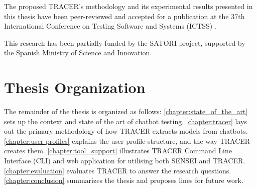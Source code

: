 The proposed \ac{TRACER}'s methodology and its experimental results presented in this thesis
have been peer-reviewed and accepted for a publication at the
37th International Conference on Testing Software and Systems (ICTSS)
\autocite{sotillodelhornoAutomatedExplorationConversational2025}.

This research has been partially funded by the SATORI project, supported by the Spanish Ministry of Science and Innovation.

\section{Thesis Organization}

The remainder of the thesis is organized as follows:
\autoref{chapter:state_of_the_art} sets up the context and state of the art of chatbot testing.
\autoref{chapter:tracer} lays out the primary methodology of how \ac{TRACER} extracts models from chatbots.
\autoref{chapter:user-profiles} explains the user profile structure, and the way \ac{TRACER} creates them.
\autoref{chapter:tool_support} illustrates \ac{TRACER} Command Line Interface (CLI) and web application for utilising both SENSEI and \ac{TRACER}.
\autoref{chapter:evaluation}
evaluates \ac{TRACER} to answer the research questions.
\autoref{chapter:conclusion}
summarizes the thesis and proposes lines for future work.
